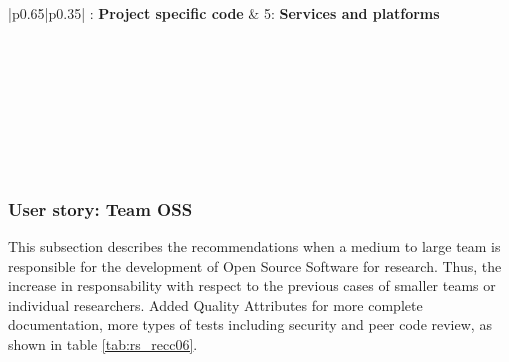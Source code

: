 \begin{center}
    \tabletail{\hline}
    \label{tab:rs_recc05}
    \small
    \begin{supertabular}{|p{0.65\linewidth}|p{0.35\linewidth}|} : \textbf{Project specific code} &
    5: \textbf{Services and platforms} \\ \hline \hline

     \\ \hline
     \\ \hline
     \\ \hline
     \\ \hline
     \\ \hline
     \\ \hline
     \\ \hline

\end{supertabular}
\end{center}

\subsubsection{User story: Team OSS}

This subsection describes the recommendations when a medium to large team is responsible for the development of Open Source Software for research. Thus, the increase in responsability with respect to the previous cases of smaller teams or individual researchers. Added Quality Attributes for more complete documentation, more types of tests including security and peer code review, as shown in table \ref{tab:rs_recc06}.

